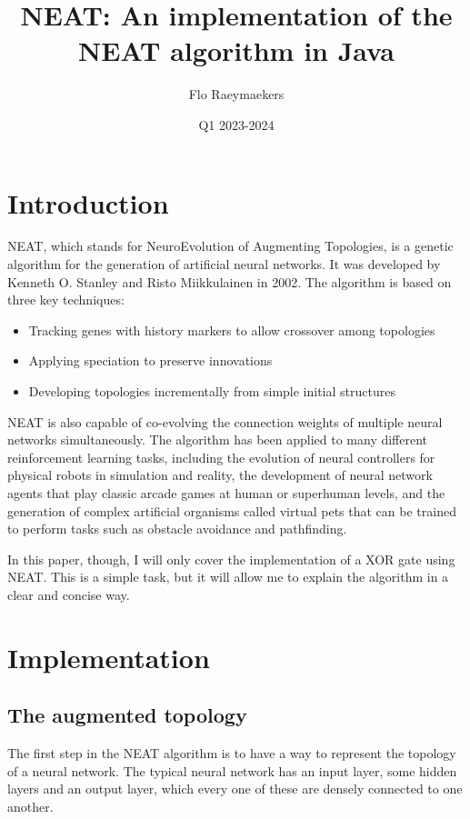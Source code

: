\documentclass[a4paper, 12pt]{article}
\title{NEAT: An implementation of the NEAT algorithm in Java}
\author{Flo Raeymaekers}
\date{Q1 2023-2024}
\begin{document}
\maketitle

\section{Introduction}

NEAT, which stands for NeuroEvolution of Augmenting Topologies, is a genetic algorithm for the generation of artificial neural networks. It was developed by Kenneth O. Stanley and Risto Miikkulainen in 2002. The algorithm is based on three key techniques:
\begin{itemize}
    \item Tracking genes with history markers to allow crossover among topologies
    \item Applying speciation to preserve innovations
    \item Developing topologies incrementally from simple initial structures
\end{itemize}

NEAT is also capable of co-evolving the connection weights of multiple neural networks simultaneously. The algorithm has been applied to many different reinforcement learning tasks, including the evolution of neural controllers for physical robots in simulation and reality, the development of neural network agents that play classic arcade games at human or superhuman levels, and the generation of complex artificial organisms called virtual pets that can be trained to perform tasks such as obstacle avoidance and pathfinding.

In this paper, though, I will only cover the implementation of a XOR gate using NEAT. This is a simple task, but it will allow me to explain the algorithm in a clear and concise way.

\section{Implementation}

\subsection{The augmented topology}

The first step in the NEAT algorithm is to have a way to represent the topology of a neural network. The typical neural network has an input layer, some hidden layers and an output layer, which every one of these are densely connected to one another.
\end{document}

